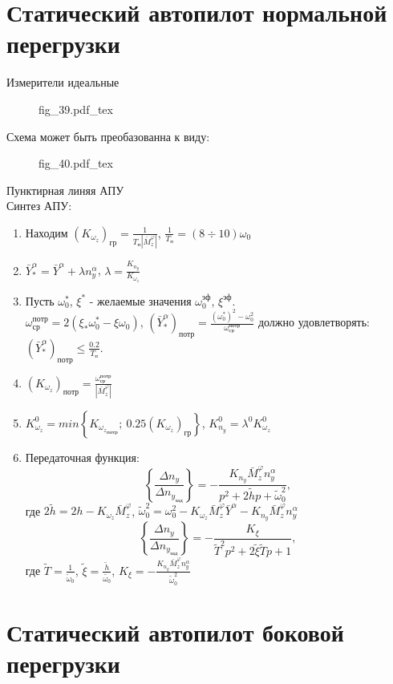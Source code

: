 \documentclass{article}
\begin{document}
\section{Статический автопилот нормальной перегрузки}
Измерители идеальные 
\begin{figure}[H]
    \centering
    {fig_39.pdf_tex}
\end{figure}

Схема может быть преобазованна к виду:

\begin{figure}[H]
    \centering
    {fig_40.pdf_tex}
\end{figure}
Пунктирная линяя АПУ\\
Синтез АПУ:
\begin{enumerate}
\item Находим $(K_{\omega_z})_{гр} =\frac{1}{T_п |\bar{M}_z^{\varphi}|}$, $\frac{1}{T_п} = (8 \div 10)\omega_0$
\item $\bar{Y}_*^\alpha =\bar{Y}^\alpha + \lambda n_y^\alpha$, $\lambda = \frac{K_{n_y}}{K_{\omega_z}}$
\item Пусть $\omega_0^*$, $\xi^*$ - желаемые значения $\omega_0^{эф}$, $\xi^{эф}$.\\
$\omega_{ср}^{потр} = 2 (\xi_* \omega_0^* - \xi \omega_0)$, $(\bar{Y}_*^\alpha)_{потр} = \frac{(\omega_0^*)^2 - \omega_0^2}{\omega_{ср}^{потр}}$
должно удовлетворять: $(\bar{Y}_*^\alpha)_{потр} \leq \frac{0.2}{T_п}$.
\item $(K_{\omega_z})_{потр} = \frac{\omega_{ср}^{потр}}{|\bar{M}_z^\varphi|}$
\item $K_{\omega_z}^0 = min \left\{ K_{{\omega_z}_{потр}};\ 0.25(K_{\omega_z})_{гр} \right\}$, $K_{n_y}^0 = \lambda^0 K_{\omega_z}^0$
\item Передаточная функция:
\[
\left\{\frac{\Delta n_y}{\Delta n_{y_{зад}}} \right\}  = -\frac{K_{n_y}\bar{M}_z^\varphi n_y^\alpha }{p^2 + 2 \tilde{h} p + \tilde{\omega}_0^2},
\]
где $2 \tilde{h} = 2h - K_{\omega_z} \bar{M}_z^\varphi$, $\tilde{\omega}^{2}_0= \omega_0^2 - K_{\omega_z} \bar{M}_z^\varphi \bar{Y}^\alpha - K_{n_y} \bar{M}_z^\varphi n_y^\alpha$ 
\[
\left\{\frac{\Delta n_y}{\Delta n_{y_{зад}}} \right\} = -\frac{K_{\xi}}{\tilde{T}^2 p^2 + 2 \tilde{\xi} \tilde{T}p + 1}, 
\]
где $\tilde{T} = \frac{1}{\tilde{\omega}_0}$, $\tilde{\xi} =\frac{\tilde{h}}{\tilde{\omega_{0}}}$, $K_\xi = -\frac{K_{n_y} \bar{M}_z^\varphi n_y^\alpha}{\tilde{\omega}_0^2}$
\end{enumerate}

\section{Статический автопилот боковой перегрузки}
\end{document}
